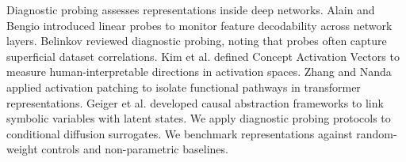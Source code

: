 \documentclass[11pt,a4paper]{article}
\begin{document}
Diagnostic probing assesses representations inside deep networks. Alain and Bengio \cite{Alain2016UnderstandingIL} introduced linear probes to monitor feature decodability across network layers. Belinkov \cite{belinkov-2022-probing} reviewed diagnostic probing, noting that probes often capture superficial dataset correlations. Kim et al. \cite{kim2018interpretability} defined Concept Activation Vectors to measure human-interpretable directions in activation spaces. Zhang and Nanda \cite{zhang2024best} applied activation patching to isolate functional pathways in transformer representations. Geiger et al. \cite{geiger2023causal} developed causal abstraction frameworks to link symbolic variables with latent states. We apply diagnostic probing protocols to conditional diffusion surrogates. We benchmark representations against random-weight controls and non-parametric baselines.
\end{document}
